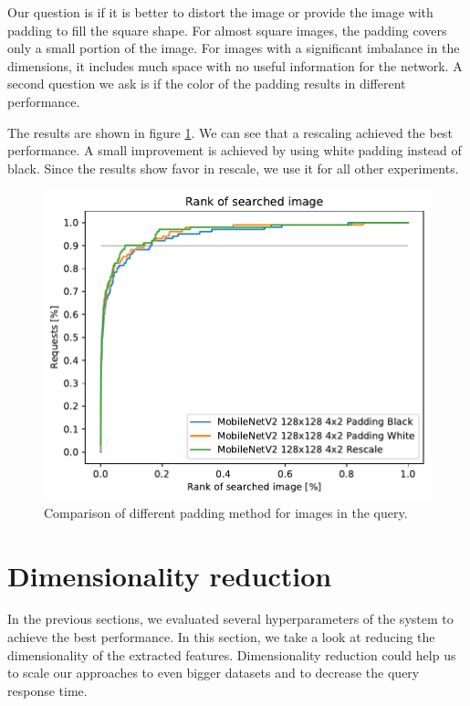 Our question  is if it is better to distort the image or provide the image with padding to fill the square shape. For almost square images, the padding covers only a small portion of the image. For images with a significant imbalance in the dimensions, it includes much space with no useful information for the network. A second question we ask is if the color of the padding results in different performance.

The results are shown in figure \ref{fig:padding}. We can see that a rescaling achieved the best performance. A small improvement is achieved by using white padding instead of black. Since the results show favor in rescale, we use it for all other experiments.

\begin{figure}
    \centering
    \includegraphics[width=0.8\linewidth]{graphs/bf57efafbbbc7b5a1744054d87d4ecfa381c9eaf2459186904190d97bcb99a81.pdf}
    \caption{Comparison of different padding method for images in the query.}
    \label{fig:padding}
\end{figure}

\section{Dimensionality reduction}

In the previous sections, we evaluated several hyperparameters of the system to achieve the best performance. In this section, we take a look at reducing the dimensionality of the extracted features. Dimensionality reduction could help us to scale our approaches to even bigger datasets and to decrease the query response time.

